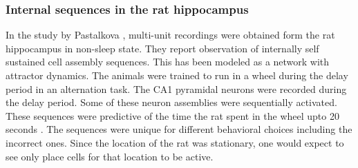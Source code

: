 \subsubsection{Internal sequences in the rat hippocampus}
In the study by Pastalkova \cite{Pastalkova2008a}, multi-unit recordings were obtained form the rat hippocampus in non-sleep state. They report observation of internally self sustained cell assembly sequences. This has been modeled as a network with attractor dynamics. The animals were trained to run in a wheel during the delay period in an alternation task. The CA1 pyramidal neurons were recorded during the delay period. Some of these neuron assemblies were sequentially activated. These sequences were predictive of the time the rat spent in the wheel upto 20 seconds \cite{Itskov2011a}. The sequences were unique for different behavioral choices including the incorrect ones. Since the location of the rat was stationary, one would expect to see only place cells for that location to be active.  \\  
